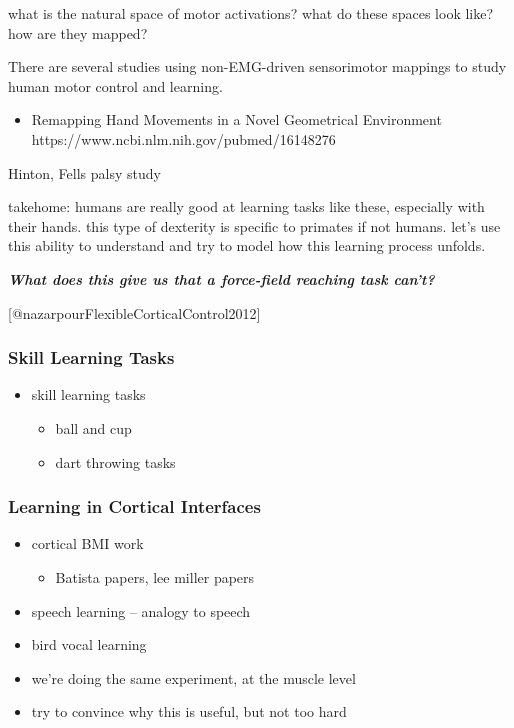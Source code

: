 \documentclass[../main.tex]{subfiles}
\begin{document}
what is the natural space of motor activations? what do these spaces look like? how are they mapped?

There are several studies using non-EMG-driven sensorimotor mappings to study human motor control and learning.

\begin{itemize}
\tightlist
\item
  Remapping Hand Movements in a Novel Geometrical Environment
  https://www.ncbi.nlm.nih.gov/pubmed/16148276
\end{itemize}

Hinton, Fells
palsy study

takehome: humans are really good at learning tasks like these, especially with their hands. this type of dexterity is specific to primates if not humans. let's use this ability to understand and try to model how this learning process unfolds.

\textbf{\emph{What does this give us that a force-field reaching task can't?}}

{[}@nazarpourFlexibleCorticalControl2012{]}

\subsubsection{Skill Learning Tasks}\label{skill-learning-tasks}

\begin{itemize}
\tightlist
\item
  skill learning tasks

  \begin{itemize}
  \tightlist
  \item
    ball and cup
  \item
    dart throwing tasks
  \end{itemize}
\end{itemize}

\subsubsection{Learning in Cortical Interfaces}\label{learning-in-cortical-interfaces}

\begin{itemize}
\item
  cortical BMI work
  \begin{itemize}
  \tightlist
  \item
    Batista papers, lee miller papers
  \end{itemize}
\item
  speech learning -- analogy to speech
\item
  bird vocal learning
\item
  we're doing the same experiment, at the muscle level
\item
  try to convince why this is useful, but not too hard
\end{itemize}
\end{document}
